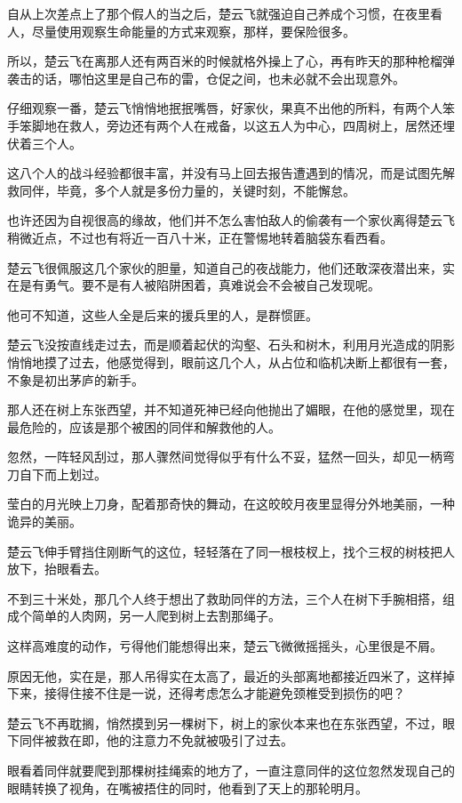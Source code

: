 自从上次差点上了那个假人的当之后，楚云飞就强迫自己养成个习惯，在夜里看人，尽量使用观察生命能量的方式来观察，那样，要保险很多。

所以，楚云飞在离那人还有两百米的时候就格外操上了心，再有昨天的那种枪榴弹袭击的话，哪怕这里是自己布的雷，仓促之间，也未必就不会出现意外。

仔细观察一番，楚云飞悄悄地抿抿嘴唇，好家伙，果真不出他的所料，有两个人笨手笨脚地在救人，旁边还有两个人在戒备，以这五人为中心，四周树上，居然还埋伏着三个人。

这八个人的战斗经验都很丰富，并没有马上回去报告遭遇到的情况，而是试图先解救同伴，毕竟，多个人就是多份力量的，关键时刻，不能懈怠。

也许还因为自视很高的缘故，他们并不怎么害怕敌人的偷袭有一个家伙离得楚云飞稍微近点，不过也有将近一百八十米，正在警惕地转着脑袋东看西看。

楚云飞很佩服这几个家伙的胆量，知道自己的夜战能力，他们还敢深夜潜出来，实在是有勇气。要不是有人被陷阱困着，真难说会不会被自己发现呢。

他可不知道，这些人全是后来的援兵里的人，是群惯匪。

楚云飞没按直线走过去，而是顺着起伏的沟壑、石头和树木，利用月光造成的阴影悄悄地摸了过去，他感觉得到，眼前这几个人，从占位和临机决断上都很有一套，不象是初出茅庐的新手。

那人还在树上东张西望，并不知道死神已经向他抛出了媚眼，在他的感觉里，现在最危险的，应该是那个被困的同伴和解救他的人。

忽然，一阵轻风刮过，那人骤然间觉得似乎有什么不妥，猛然一回头，却见一柄弯刀自下而上划过。

莹白的月光映上刀身，配着那奇快的舞动，在这皎皎月夜里显得分外地美丽，一种诡异的美丽。

楚云飞伸手臂挡住刚断气的这位，轻轻落在了同一根枝杈上，找个三杈的树枝把人放下，抬眼看去。

不到三十米处，那几个人终于想出了救助同伴的方法，三个人在树下手腕相搭，组成个简单的人肉网，另一人爬到树上去割那绳子。

这样高难度的动作，亏得他们能想得出来，楚云飞微微摇摇头，心里很是不屑。

原因无他，实在是，那人吊得实在太高了，最近的头部离地都接近四米了，这样掉下来，接得住接不住是一说，还得考虑怎么才能避免颈椎受到损伤的吧？

楚云飞不再耽搁，悄然摸到另一棵树下，树上的家伙本来也在东张西望，不过，眼下同伴被救在即，他的注意力不免就被吸引了过去。

眼看着同伴就要爬到那棵树挂绳索的地方了，一直注意同伴的这位忽然发现自己的眼睛转换了视角，在嘴被捂住的同时，他看到了天上的那轮明月。

